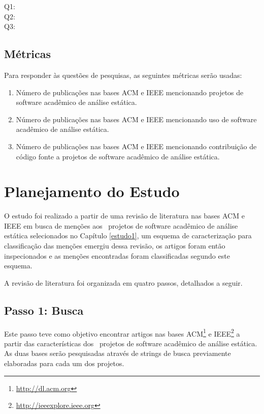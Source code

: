 \begin{description}
  \item [Q1:] \EstudoDoisQuestaoUm
  \item [Q2:] \EstudoDoisQuestaoDois
  \item [Q3:] \EstudoDoisQuestaoTres
\end{description}

\subsection{Métricas}

Para responder às questões de pesquisas, as seguintes métricas serão usadas:

\begin{enumerate}
  \item Número de publicações nas bases ACM e IEEE mencionando projetos de
    software acadêmico de análise estática.
  \item Número de publicações nas bases ACM e IEEE mencionando uso de
    software acadêmico de análise estática.
  \item Número de publicações nas bases ACM e IEEE mencionando contribuição de
    código fonte a projetos de software acadêmico de análise estática.
\end{enumerate}


\section{Planejamento do Estudo} \label{estudo2:planejamento} %

O estudo foi realizado a partir de uma revisão de literatura nas bases ACM e
IEEE em busca de menções aos \SoftwareCount \ projetos de software acadêmico de
análise estática selecionados no Capítulo \ref{estudo1}, um esquema de
caracterização para classificação das menções emergiu dessa revisão, os artigos
foram então inspecionados e as menções encontradas foram classificadas segundo
este esquema.

A revisão de literatura foi organizada em quatro passos, detalhados a seguir.

\subsection{Passo 1: Busca}

Este passo teve como objetivo encontrar artigos nas bases
ACM\footnote{\url{http://dl.acm.org}} e
IEEE\footnote{\url{http://ieeexplore.ieee.org}} a partir das características
dos \SoftwareCount \ projetos de software acadêmico de análise estática.
As duas bases serão pesquisadas através de strings de busca previamente
elaboradas para cada um dos projetos.

